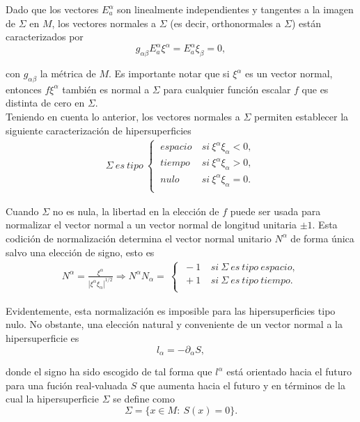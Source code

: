 \documentclass[16pt,a4paper]{article}
\numberwithin{equation}{section}
\theoremstyle{definition}
\begin{document}
Dado que los vectores $E^{\alpha}_{a}$ son linealmente independientes y tangentes a la imagen de $\Sigma$ en $M$, los vectores normales a $\Sigma$ (es decir, orthonormales a $\Sigma$) están caracterizados por 
\begin{equation*}
g_{\alpha \beta}E^{\alpha}_{a}\xi^{\alpha} = E^{\alpha}_{a}\xi_{\beta} = 0,
\end{equation*}

con $g_{\alpha \beta}$ la métrica de $M$. Es importante notar que si $\xi^{\alpha}$ es un vector normal, entonces $f\xi^{\alpha}$ también es normal a $\Sigma$ para cualquier función escalar $f$ que es distinta de cero en $\Sigma$.\\

Teniendo en cuenta lo anterior, los vectores normales a $\Sigma$ permiten establecer la siguiente caracterización de hipersuperficies
\begin{align*}
\Sigma\ es\ tipo\  
\begin{cases}
\ espacio\ & si\ \xi^{\alpha}\xi_{\alpha}<0,\\
\ tiempo\ & si\ \xi^{\alpha}\xi_{\alpha}>0,\\
\ nulo\ & si\ \xi^{\alpha}\xi_{\alpha}=0.\\
\end{cases}
\end{align*}

Cuando $\Sigma$ no es nula, la libertad en la elección de $f$ puede ser usada para normalizar el vector normal a un vector normal de longitud unitaria $\pm 1$. Esta codición de normalización determina el vector normal unitario $N^{\alpha}$ de forma única salvo una elección de signo, esto es
\begin{align*}
N^{\alpha} = \frac{\xi^{\alpha}}{|\xi^{\alpha}\xi_{\alpha}|^{1/2}} \Rightarrow N^{\alpha}N_{\alpha} =\ 
\begin{cases}
\ -1 & \ si\ \Sigma\ es\ tipo\ espacio,\\
\ +1 & \ si\ \Sigma\ es\ tipo\ tiempo.\\
\end{cases}
\end{align*}

Evidentemente, esta normalización es imposible para las hipersuperficies tipo nulo. No obstante, una elección natural y conveniente de un vector normal a la hipersuperficie es 
\begin{equation*}
l_\alpha = -\partial_\alpha S,
\end{equation*}

donde el signo ha sido escogido de tal forma que $l^\alpha$ está orientado hacia el futuro para una fución real-valuada $S$ que aumenta hacia el futuro y en términos de la cual la hipersuperficie $\Sigma$ se define como
\begin{equation*}
\Sigma = \lbrace x \in M:\ S(x) = 0 \rbrace.
\end{equation*}
\end{document}
